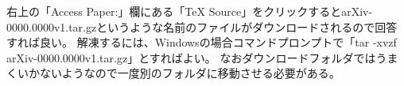 \documentclass[11pt,a4paper,oneside,lualatex]{ltjsarticle} %
\numberwithin{equation}{section} %
\begin{document}

右上の「Access Paper:」欄にある「TeX Source」をクリックするとarXiv-0000.0000v1.tar.gzというような名前のファイルがダウンロードされるので回答すれば良い。
解凍するには、Windowsの場合コマンドプロンプトで「tar -xvzf arXiv-0000.0000v1.tar.gz」とすればよい。
なおダウンロードフォルダではうまくいかないようなので一度別のフォルダに移動させる必要がある。


\section{} \label{sec:}



\subsubsection{}




\subsubsection{}




\subsubsection{}








\end{document}
